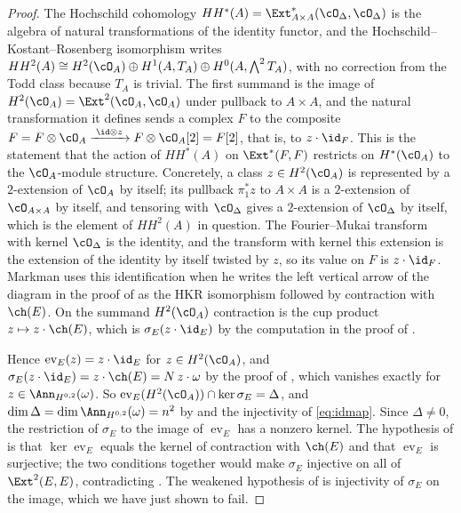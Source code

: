 \begin{proof}
The Hochschild cohomology $HH^{*}(A)=\Ext^{*}_{A\times A}(\cO_{\Delta},\cO_{\Delta})$
is the algebra of natural transformations of the identity functor, and the
Hochschild--Kostant--Rosenberg isomorphism \cite{Cal05,BF08} writes
$HH^{2}(A)\cong H^{2}(\cO_{A})\oplus H^{1}(A,T_{A})\oplus H^{0}(A,\bigwedge^{2}T_{A})$,
with no correction from the Todd class because $T_{A}$ is trivial. The first
summand is the image of $H^{2}(\cO_{A})=\Ext^{2}(\cO_{A},\cO_{A})$ under
pullback to $A\times A$, and the natural transformation it defines sends a
complex $F$ to the composite $F=F\otimes\cO_{A}\xrightarrow{\;\id\otimes z\;}
F\otimes\cO_{A}[2]=F[2]$, that is, to $z\cdot\id_{F}$. This is the statement
that the action of $HH^{*}(A)$ on $\Ext^{*}(F,F)$ restricts on $H^{*}(\cO_{A})$
to the $\cO_{A}$-module structure. Concretely, a class $z\in H^{2}(\cO_{A})$
is represented by a $2$-extension of $\cO_{A}$ by itself; its pullback
$\pi_{1}^{*}z$ to $A\times A$ is a $2$-extension of $\cO_{A\times A}$ by
itself, and tensoring with $\cO_{\Delta}$ gives a $2$-extension of
$\cO_{\Delta}$ by itself, which is the element of $HH^{2}(A)$ in question. The
Fourier--Mukai transform with kernel $\cO_{\Delta}$ is the identity, and the
transform with kernel this extension is the extension of the identity by
itself twisted by $z$, so its value on $F$ is $z\cdot\id_{F}$. Markman uses
this identification when he writes the left vertical arrow of the diagram in
the proof of \cite[Lemma~11.3]{Mar25b} as the HKR isomorphism followed by
contraction with $\ch(E)$. On the summand $H^{2}(\cO_{A})$ contraction is the
cup product $z\mapsto z\cdot\ch(E)$, which is $\sigma_{E}(z\cdot\id_{E})$ by
the computation in the proof of .

Hence $\operatorname{ev}_{E}(z)=z\cdot\id_{E}$ for $z\in H^{2}(\cO_{A})$, and
$\sigma_{E}(z\cdot\id_{E})=z\cdot\ch(E)=N\,z\cdot\omega$ by the proof of
, which vanishes exactly for
$z\in\Ann_{H^{0,2}}(\omega)$. So
$\operatorname{ev}_{E}(H^{2}(\cO_{A}))\cap\ker\sigma_{E}=\Delta$, and
$\dim\Delta=\dim\Ann_{H^{0,2}}(\omega)=n^{2}$ by  and
the injectivity of \eqref{eq:idmap}. Since $\Delta\ne0$, the restriction of
$\sigma_{E}$ to the image of $\operatorname{ev}_{E}$ has a nonzero kernel.
The hypothesis of \cite[Lemma 11.3]{Mar25b} is that
$\ker\operatorname{ev}_{E}$ equals the kernel of contraction with $\ch(E)$ and
that $\operatorname{ev}_{E}$ is surjective; the two conditions together would
make $\sigma_{E}$ injective on all of $\Ext^{2}(E,E)$, contradicting
. The weakened hypothesis of
\cite[Question 11.4]{Mar25b} is injectivity of $\sigma_{E}$ on the image,
which we have just shown to fail.
\end{proof}

